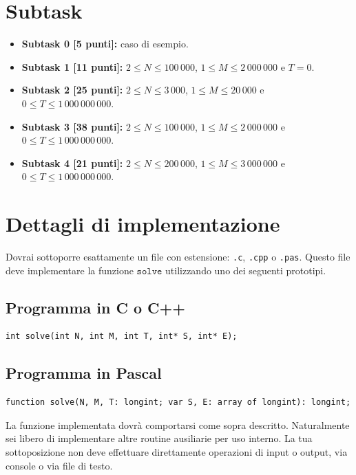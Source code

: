 \documentclass[a4paper,11pt]{article}
\begin{document}
\section*{Subtask}
\begin{itemize}
\item \textbf{Subtask 0 \phantom{1}[5 punti]:} caso di esempio.
\item \textbf{Subtask 1 [11 punti]:} $2 \le N\le 100\,000$, $1 \le M\le 2\,000\,000$ e $T = 0$.
\item \textbf{Subtask 2 [25 punti]:} $2 \le N \le 3\,000$, $1 \le M \le 20\,000$ e $0 \le T \le 1\,000\,000\,000$.
\item \textbf{Subtask 3 [38 punti]:} $2 \le N \le 100\,000$, $1 \le M\le 2\,000\,000$ e $0 \le T \le 1\,000\,000\,000$.
\item \textbf{Subtask 4 [21 punti]:} $2 \le N \le 200\,000$, $1 \le M \le 3\,000\,000$ e $0 \le T \le 1\,000\,000\,000$.
\end{itemize}


\section*{Dettagli di implementazione}
Dovrai sottoporre esattamente un file con estensione: \texttt{.c},
\texttt{.cpp} o \texttt{.pas}. Questo file deve implementare la
funzione $\texttt{solve}$ utilizzando uno dei seguenti
prototipi.

\subsection*{Programma in C o C++}
\begin{verbatim}
int solve(int N, int M, int T, int* S, int* E);
\end{verbatim}

\subsection*{Programma in Pascal}
\begin{verbatim}
function solve(N, M, T: longint; var S, E: array of longint): longint;
\end{verbatim}

La funzione implementata dovrà comportarsi come sopra
descritto. Naturalmente sei libero di implementare altre routine
ausiliarie per uso interno. La tua sottoposizione non deve effettuare
direttamente operazioni di input o output, via console o via file di
testo.
\end{document}
